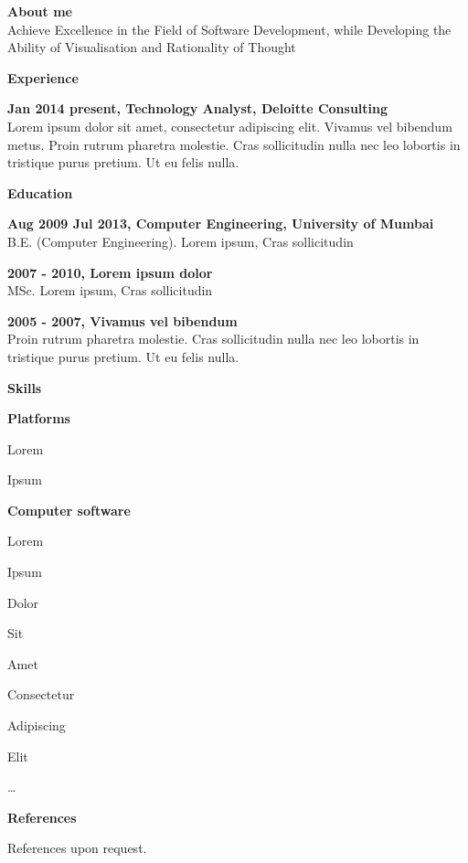 \documentclass[a4paper,12pt,final]{memoir}
\newcommand{\Sep}{\vspace{1.5em}}
\newcommand{\SmallSep}{\vspace{0.5em}}
\newenvironment{AboutMe}
	{\ignorespaces\textbf{\color{Plum} About me}}
	{\Sep\ignorespacesafterend}
\newcommand{\CVSection}[1]
	{\Large\textbf{#1}\par
	\SmallSep\normalsize\normalfont}
\newcommand{\CVItem}[1]
	{\textbf{\color{Plum} #1}}
\begin{document}
\normalsize\normalfont

\begin{AboutMe}
\\Achieve Excellence in the Field of Software Development, while \allowbreak  Developing 
the Ability of Visualisation and Rationality of Thought
\end{AboutMe}

\CVSection{Experience}
\CVItem{Jan 2014 \textendash \space present, Technology Analyst, Deloitte Consulting}\\
Lorem ipsum dolor sit amet, consectetur adipiscing elit. Vivamus vel bibendum metus. Proin rutrum pharetra molestie. Cras sollicitudin nulla nec leo lobortis in tristique purus pretium. Ut eu felis nulla.
\SmallSep


\CVSection{Education}
\CVItem{Aug 2009 \textendash \space Jul 2013, Computer Engineering, University of Mumbai}\\
B.E. (Computer Engineering). Lorem ipsum, Cras sollicitudin
\SmallSep

\CVItem{2007 - 2010, Lorem ipsum dolor}\\
MSc. Lorem ipsum, Cras sollicitudin
\SmallSep

\CVItem{2005 - 2007, Vivamus vel bibendum}\\
Proin rutrum pharetra molestie. Cras sollicitudin nulla nec leo lobortis in tristique purus pretium. Ut eu felis nulla.
\Sep

\CVSection{Skills}
\CVItem{Platforms}
\begin{multicols}{1}
\begin{compactitem}[\color{Plum}$\circ$]
	\item Lorem 
	\item Ipsum 
\end{compactitem}
\end{multicols}
\SmallSep

\CVItem{Computer software}
\begin{multicols}{1}
\begin{compactitem}[\color{Plum}$\circ$]
	\item Lorem 
	\item Ipsum 
	\item Dolor 
	\item Sit 
	\item Amet
	\item Consectetur 
	\item Adipiscing 
	\item Elit
	\item \ldots
\end{compactitem}
\end{multicols}
\Sep 

\CVSection{References}
References upon request.

\end{document}
